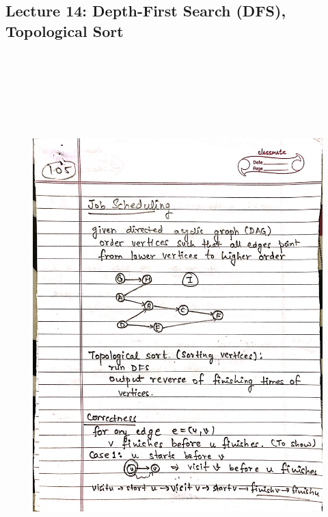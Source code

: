 \newpage
{\color{black} \subsection*{Lecture 14: Depth-First Search (DFS), Topological Sort}}
\begin{figure}[H]
    \centering
    \includegraphics[width=16cm, height=21cm]{"./MIT-6.006/MIT-6006-105"}
\end{figure}

